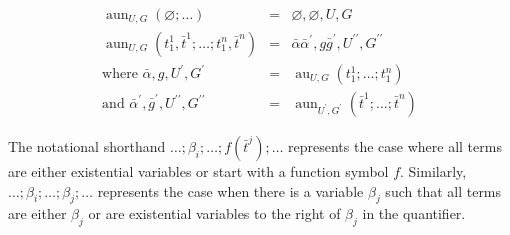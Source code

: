 \documentclass{article}
\newcommand{\tmop}[1]{\ensuremath{\operatorname{#1}}}
\begin{document}
\begin{table}[t]
\begin{eqnarray*}
    \tmop{aun}_{U, G} (\varnothing ; \ldots) & = & \varnothing, \varnothing,
    U, G\\
    \tmop{aun}_{U, G} (t^1_1, \bar{t}^1 ; \ldots ; t^n_1, \bar{t}^n) & = &
    \bar{\alpha} \bar{\alpha}^{\prime}, g \bar{g}^{\prime}, U^{\prime\prime},
    G^{\prime\prime}\\
    \text{where \ } \bar{\alpha}, g, U^{\prime}, G^{\prime} & = &
    \tmop{au}_{U, G} (t_1^1 ; \ldots ; t_1^n)\\
    \text{and \ } \bar{\alpha}^{\prime}, \bar{g}^{\prime}, U^{\prime\prime},
    G^{\prime\prime} & = & \tmop{aun}_{U^{\prime}, G^{\prime}} (\bar{t}^1 ;
    \ldots ; \bar{t}^n)
  \end{eqnarray*}
  \label{AntiUnifAlg}
  \caption{Abductive anti-unification algorithm}
\end{table} The notational shorthand $\ldots ; \beta_i ; \ldots ; f
(\bar{t}^j) ; \ldots$ represents the case where all terms are either
existential variables or start with a function symbol $f$. Similarly, $\ldots
; \beta_i ; \ldots ; \beta_j ; \ldots$ represents the case when there is a
variable $\beta_j$ such that all terms are either $\beta_j$ or are existential
variables to the right of $\beta_j$ in the quantifier.
\end{document}
